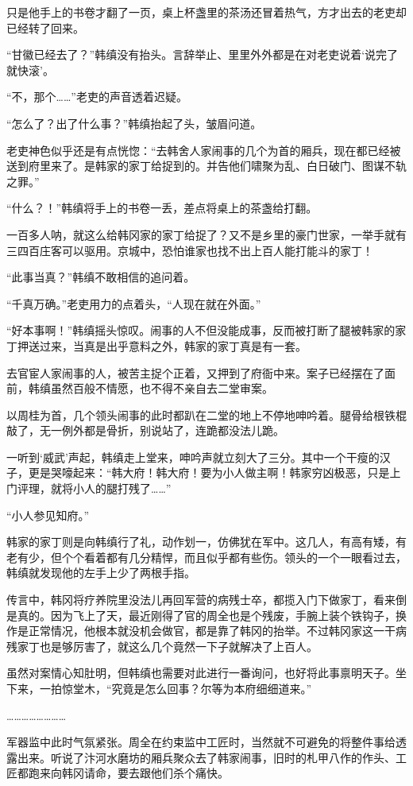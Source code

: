 只是他手上的书卷才翻了一页，桌上杯盏里的茶汤还冒着热气，方才出去的老吏却已经转了回来。

“甘徽已经去了？”韩缜没有抬头。言辞举止、里里外外都是在对老吏说着‘说完了就快滚’。

“不，那个……”老吏的声音透着迟疑。

“怎么了？出了什么事？”韩缜抬起了头，皱眉问道。

老吏神色似乎还是有点恍惚：“去韩舍人家闹事的几个为首的厢兵，现在都已经被送到府里来了。是韩家的家丁给捉到的。并告他们啸聚为乱、白日破门、图谋不轨之罪。”

“什么？！”韩缜将手上的书卷一丢，差点将桌上的茶盏给打翻。

一百多人呐，就这么给韩冈家的家丁给捉了？又不是乡里的豪门世家，一举手就有三四百庄客可以驱用。京城中，恐怕谁家也找不出上百人能打能斗的家丁！

“此事当真？”韩缜不敢相信的追问着。

“千真万确。”老吏用力的点着头，“人现在就在外面。”

“好本事啊！”韩缜摇头惊叹。闹事的人不但没能成事，反而被打断了腿被韩家的家丁押送过来，当真是出乎意料之外，韩家的家丁真是有一套。

去官宦人家闹事的人，被苦主捉个正着，又押到了府衙中来。案子已经摆在了面前，韩缜虽然百般不情愿，也不得不亲自去二堂审案。

以周桂为首，几个领头闹事的此时都趴在二堂的地上不停地呻吟着。腿骨给根铁棍敲了，无一例外都是骨折，别说站了，连跪都没法儿跪。

一听到‘威武’声起，韩缜走上堂来，呻吟声就立刻大了三分。其中一个干瘦的汉子，更是哭嚎起来：“韩大府！韩大府！要为小人做主啊！韩家穷凶极恶，只是上门评理，就将小人的腿打残了……”

“小人参见知府。”

韩家的家丁则是向韩缜行了礼，动作划一，仿佛犹在军中。这几人，有高有矮，有老有少，但个个看着都有几分精悍，而且似乎都有些伤。领头的一个一眼看过去，韩缜就发现他的左手上少了两根手指。

传言中，韩冈将疗养院里没法儿再回军营的病残士卒，都揽入门下做家丁，看来倒是真的。因为飞上了天，最近刚得了官的周全也是个残废，手腕上装个铁钩子，换作是正常情况，他根本就没机会做官，都是靠了韩冈的抬举。不过韩冈家这一干病残家丁也是够厉害了，就这么几个竟然一下子就解决了上百人。

虽然对案情心知肚明，但韩缜也需要对此进行一番询问，也好将此事禀明天子。坐下来，一拍惊堂木，“究竟是怎么回事？尔等为本府细细道来。”

……………………

军器监中此时气氛紧张。周全在约束监中工匠时，当然就不可避免的将整件事给透露出来。听说了汴河水磨坊的厢兵聚众去了韩家闹事，旧时的札甲八作的作头、工匠都跑来向韩冈请命，要去跟他们杀个痛快。


